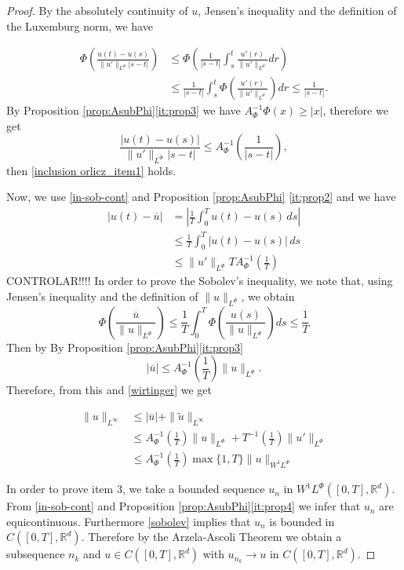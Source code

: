 \documentclass[twoside]{article}
\theoremstyle{remark}
\newcommand{\orlnor}{\|_{L^{\Phi}}}
\newcommand{\linf}{\|_{L^{\infty}}}
\newcommand{\lphi}{L^{\Phi}}
\newcommand{\wphi}{W^{1}\lphi}
\newcommand{\sobnor}{\|_{W^{1}\lphi}}
\newcommand{\rr}{\mathbb{R}}
\renewcommand{\leq}{\leqslant}
\renewcommand{\geq}{\geqslant}
\begin{document}
\begin{proof} By the absolutely continuity of $u$, Jensen's inequality and the definition of 
the Luxemburg norm, we have

\[
 \begin{split}
    \Phi\left( \frac{u(t)-u(s)}{\|u'\orlnor |s-t|}\right) &\leq  \Phi\left( \frac{1}{ |s-t|}\int_s^t  \frac{u'(r)}{\|u'\orlnor }dr\right)\\
    &\leq   \frac{1}{ |s-t|}\int_s^t  \Phi\left(\frac{u'(r)}{\|u'\orlnor }\right)dr
    \leq \frac{1}{ |s-t|}.
 \end{split}
\]
By Proposition \ref{prop:AsubPhi}\eqref{it:prop3}  we have $A^{-1}_{\Phi}\Phi(x)\geq |x|$, therefore we get
\[
    \frac{|u(t)-u(s)|}{\|u'\orlnor |s-t|} 
    \leq  A_{\Phi}^{-1}\left(\frac{1}{ |s-t|}\right),
\]
then  \ref{inclusion orlicz_item1} holds.

Now, we use \ref{in-sob-cont} and  Proposition \ref{prop:AsubPhi} \eqref{it:prop2} and we have 
\[\begin{split}
\left|u(t)-\overline {u}\right|&=
\left|\frac{1}{T}\int_0^T u(t)-u(s)\,ds\right|
\\
&\leq \frac{1}{T} \int_0^T |u(t)-u(s)|\,ds
\\
&\leq \|u'\orlnor T A_{\Phi}^{-1}\left(\frac{1}{T}\right)
\end{split}
\] 
	CONTROLAR!!!!
In order to prove the Sobolev's inequality, we note that, using Jensen's inequality and 
the definition of $\|u\orlnor$, we obtain
\[ \Phi\left( \frac{ \overline{u}}{\|u\orlnor} \right) \leq
\frac{1}{T}\int_0^T\Phi\left(\frac{u(s)}{\|u\orlnor}\right)ds\leq\frac{1}{T}
\]
Then  by By Proposition \ref{prop:AsubPhi}\eqref{it:prop3} 
\[|\overline{u}|\leq A_{\Phi}^{-1}\left(\frac{1}{T}\right) \|u\orlnor.\]
Therefore, from this and \eqref{wirtinger} we get

\[\begin{split}
 \|u\linf &\leq |\overline{u}|+\|\tilde{u}\linf\\
 &\leq  
 A_{\Phi}^{-1}\left(\frac{1}{T}\right) \|u\orlnor+T ^{-1}\left(\frac{1}{T}\right)\|u'\orlnor\\
 &\leq A_{\Phi}^{-1}\left(\frac{1}{T}\right)\max\{1,T\}\|u\sobnor
 \end{split}
 \]
 



In order to prove item 3, we take a bounded sequence
$u_n$ in $\wphi([0,T],\rr^d)$. From \eqref{in-sob-cont} and Proposition \ref{prop:AsubPhi}\eqref{it:prop4}  we infer that $u_n$ are equicontinuous. Furthermore \eqref{sobolev} implies that $u_n$ is bounded in $C([0,T],\rr^d)$. Therefore by the Arzela-Ascoli Theorem we  obtain a subsequence $n_k$ and  $u\in C([0,T],\rr^d)$ with $u_{n_k}\to u$ in $C([0,T],\rr^d)$.

\end{proof}
\end{document}
